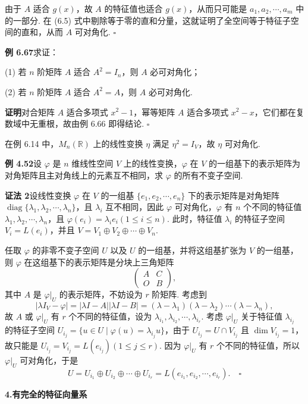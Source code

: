 \documentclass[UTF8,12pt,a4paper,fontset=fandol]{ctexart}
\begin{document}
由于 $A$ 适合 $g(x)$，故 $A$ 的特征值也适合 $g(x)$，从而只可能是 $a_1,a_2,\cdots,a_m$ 中的一部分. 在 (6.5) 式中剔除等于零的直和分量，这就证明了全空间等于特征子空间的直和，从而 $A$ 可对角化. $\square$

\noindent\textbf{例 6.67}\quad 求证：

(1) 若 $n$ 阶矩阵 $A$ 适合 $A^2=I_n$，则 $A$ 必可对角化；

(2) 若 $n$ 阶矩阵 $A$ 适合 $A^2=A$，则 $A$ 必可对角化.

\noindent\textbf{证明}\quad 对合矩阵 $A$ 适合多项式 $x^2-1$，幂等矩阵 $A$ 适合多项式 $x^2-x$，它们都在复数域中无重根，故由例 6.66 即得结论. $\square$

在例 6.14 中，$M_n(\mathbb{R})$ 上的线性变换 $\eta$ 满足 $\eta^2=I_V$，故 $\eta$ 可对角化.

\noindent\textbf{例 4.52}\quad 设 $\varphi$ 是 $n$ 维线性空间 $V$ 上的线性变换，$\varphi$ 在 $V$ 的一组基下的表示矩阵为对角矩阵且主对角线上的元素互不相同，求 $\varphi$ 的所有不变子空间.

\noindent\textbf{证法 2}\quad 设线性变换 $\varphi$ 在 $V$ 的一组基 $\{e_1,e_2,\cdots,e_n\}$ 下的表示矩阵是对角矩阵 $\operatorname{diag}\{\lambda_1,\lambda_2,\cdots,\lambda_n\}$，且 $\lambda_i$ 互不相同，因此 $\varphi$ 可对角化，$\varphi$ 有 $n$ 个不同的特征值 $\lambda_1,\lambda_2,\cdots,\lambda_n$，且 $\varphi(e_i)=\lambda_ie_i(1\le i\le n)$. 此时，特征值 $\lambda_i$ 的特征子空间 $V_i=L(e_i)$，并且 $V=V_1\oplus V_2\oplus\cdots\oplus V_n$.

任取 $\varphi$ 的非零不变子空间 $U$ 以及 $U$ 的一组基，并将这组基扩张为 $V$ 的一组基，则 $\varphi$ 在这组基下的表示矩阵是分块上三角矩阵
\[
\left(\begin{array}{cc}
A & C\\
O & B
\end{array}\right),
\]
其中 $A$ 是 $\varphi|_U$ 的表示矩阵，不妨设为 $r$ 阶矩阵. 考虑到
\[
|\lambda I_V-\varphi|=|\lambda I-A||\lambda I-B|=(\lambda-\lambda_1)(\lambda-\lambda_2)\cdots(\lambda-\lambda_n),
\]
故 $A$ 或 $\varphi|_U$ 有 $r$ 个不同的特征值，设为 $\lambda_{i_1},\lambda_{i_2},\cdots,\lambda_{i_r}$. 考虑 $\varphi|_U$ 关于特征值 $\lambda_{i_j}$ 的特征子空间 $U_{i_j}=\{u\in U\mid \varphi(u)=\lambda_{i_j}u\}$，由于 $U_{i_j}=U\cap V_{i_j}$ 且 $\dim V_{i_j}=1$，故只能是 $U_{i_j}=V_{i_j}=L(e_{i_j})(1\le j\le r)$. 因为 $\varphi|_U$ 有 $r$ 个不同的特征值，所以 $\varphi|_U$ 可对角化，于是
\[
U=U_{i_1}\oplus U_{i_2}\oplus\cdots\oplus U_{i_r}=L(e_{i_1},e_{i_2},\cdots,e_{i_r}). \quad \square
\]

\noindent\textbf{4.\quad 有完全的特征向量系}
\end{document}
